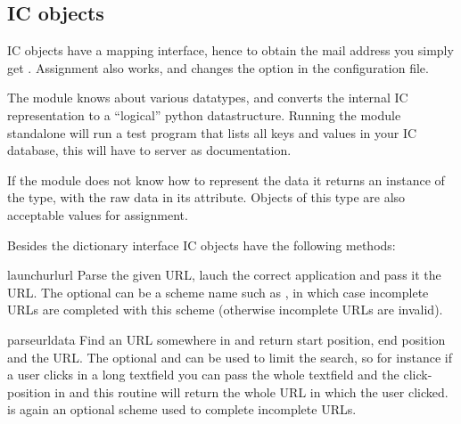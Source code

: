 \subsection{IC objects}

IC objects have a mapping interface, hence to obtain the mail address
you simply get . Assignment also works, and
changes the option in the configuration file.

The module knows about various datatypes, and converts the internal IC
representation to a ``logical'' python datastructure. Running the
 module standalone will run a test program that lists all
keys and values in your IC database, this will have to server as
documentation.

If the module does not know how to represent the data it returns an
instance of the  type, with the raw data in its
 attribute. Objects of this type are also acceptable values
for assignment.

Besides the dictionary interface IC objects have the following methods:


\begin{funcdesc}{launchurl}{url }
Parse the given URL, lauch the correct application and pass it the
URL. The optional  can be a scheme name such as
, in which case incomplete URLs are completed with this
scheme (otherwise incomplete URLs are invalid). 
\end{funcdesc}

\begin{funcdesc}{parseurl}{data }
Find an URL somewhere in  and return start position, end
position and the URL. The optional  and  can be
used to limit the search, so for instance if a user clicks in a long
textfield you can pass the whole textfield and the click-position in
 and this routine will return the whole URL in which the
user clicked.  is again an optional scheme used to complete
incomplete URLs.
\end{funcdesc}

